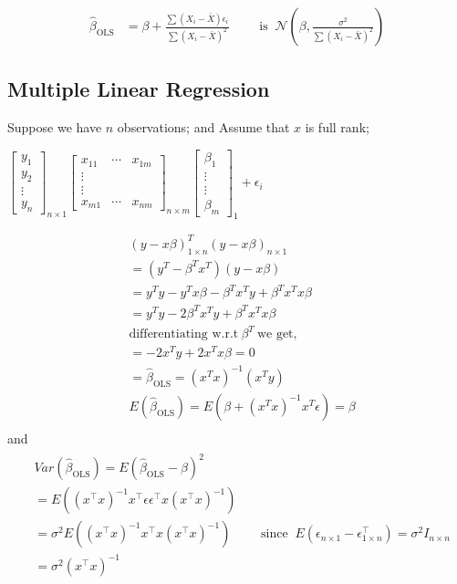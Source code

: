 \documentclass[12pt,a4paper]{article}
\begin{document}
 \begin{align*}
    \hat{\beta}_{\text{OLS}}&= \beta + \frac{\sum (X_{i}-\bar{X})\epsilon_{i}}{\sum (X_{i}- \bar{X} )^2 } \qquad \text{ is }  \ \mathcal{N}\left( \beta,\frac{\sigma^2}{\sum (X_{i}-\bar{X})^2}  \right) 
\end{align*}
\pagebreak

\subsection*{Multiple Linear Regression}

Suppose we have \(n\) observations; and  Assume that \(x\) is full rank;

\(\left[\begin{array}{c}y_1 \\ y_2 \\ \vdots \\ y_n\end{array}\right]_{n \times 1}\left[\begin{array}{ccc}x_{11} & \cdots & x_{1 m} \\ \vdots & & \\ \vdots & & \\ x_{m 1} & \cdots & x_{n m}\end{array}\right]_{n \times m}\left[\begin{array}{c}\beta_1 \\ \vdots \\ \vdots \\ \beta_m\end{array}\right]_1 + \epsilon_{i}\)
 
\begin{align*}
    &\left( y-x\beta \right)^{T}_{1\times n}(y-x\beta)_{n\times 1}\\
    &=(y^T-\beta^Tx^T)(y-x\beta)\\
    &=y^Ty-y^Tx\beta-\beta^Tx^Ty+ \beta^{T}x^{T}x\beta\\
    &=y^T y-2\beta^{T} x^{T} y+ \beta^{T} x^{T} x \beta\\
    &\text{differentiating w.r.t} \ \beta^T \ \text{we get,}\\
    &=-2x^{T}y +2x^{T}x\beta =0 \\
    &=\hat{\beta}_{\text{OLS}}=\left( x^Tx \right)^{-1}(x^Ty)\\ 
    &E(\hat{\beta}_{\text{OLS}})=E(\beta + (x^Tx)^{-1}x^T \epsilon)= \beta\\
\end{align*}
and
\begin{align*}
    \begin{aligned}
    & Var(\hat{\beta}_{\text{OLS}})=E\left(\hat{\beta}_{\text {OLS}}-\beta\right)^2 \\
    &=E\left(\left(x^{\top} x\right)^{-1} x^{\top} \epsilon \epsilon^{\top} x\left(x^{\top} x\right)^{-1}\right) \\
    &= \sigma^2 E\left(\left(x^{\top} x\right)^{-1} x^{\top} x\left(x^{\top} x\right)^{-1}\right) \qquad \text{ since } \ E\left( \epsilon_{n \times 1}-\epsilon^{\top}_{1 \times n} \right) = \sigma^2I_{n \times n} \\
    &=\sigma^2\left(x^{\top} x\right)^{-1}
    \end{aligned}
    \end{align*}
\end{document}
